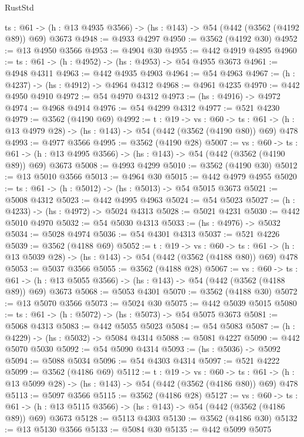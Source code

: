 \begin{lexlean}{RustStd}
\begin{coremodule}
  {ts : @61} -> (h : @13 @4935 @3566) -> (hs : @143) -> @54 (@442 (@3562 (@4192 @89)) @69) @3673
@4948 := @4933 @4297
@4950 := @3562 (@4192 @30)
@4952 := @13 @4950 @3566
@4953 := @4904 @30
@4955 := @442 @4919 @4895
@4960 := {ts : @61} -> (h : @4952) -> (hs : @4953) -> @54 @4955 @3673
@4961 := @4948 @4311
@4963 := @442 @4935 @4903
@4964 := @54 @4963
@4967 := (h : @4237) -> (hs : @4912) -> @4964 @4312
@4968 := @4961 @4235
@4970 := @442 @4950 @4910
@4972 := @54 @4970 @4312
@4973 := (hs : @4916) -> @4972
@4974 := @4968 @4914
@4976 := @54 @4299 @4312
@4977 := @521 @4230
@4979 := @3562 (@4190 @69)
@4992 := {t : @19} ->
  {vs : @60} ->
  {ts : @61} -> (h : @13 @4979 @28) -> (hs : @143) -> @54 (@442 (@3562 (@4190 @80)) @69) @478
@4993 := @4977 @3566
@4995 := @3562 (@4190 @28)
@5007 := {vs : @60} ->
  {ts : @61} -> (h : @13 @4995 @3566) -> (hs : @143) -> @54 (@442 (@3562 (@4190 @89)) @69) @3673
@5008 := @4993 @4299
@5010 := @3562 (@4190 @30)
@5012 := @13 @5010 @3566
@5013 := @4964 @30
@5015 := @442 @4979 @4955
@5020 := {ts : @61} -> (h : @5012) -> (hs : @5013) -> @54 @5015 @3673
@5021 := @5008 @4312
@5023 := @442 @4995 @4963
@5024 := @54 @5023
@5027 := (h : @4233) -> (hs : @4972) -> @5024 @4313
@5028 := @5021 @4231
@5030 := @442 @5010 @4970
@5032 := @54 @5030 @4313
@5033 := (hs : @4976) -> @5032
@5034 := @5028 @4974
@5036 := @54 @4301 @4313
@5037 := @521 @4226
@5039 := @3562 (@4188 @69)
@5052 := {t : @19} ->
  {vs : @60} ->
  {ts : @61} -> (h : @13 @5039 @28) -> (hs : @143) -> @54 (@442 (@3562 (@4188 @80)) @69) @478
@5053 := @5037 @3566
@5055 := @3562 (@4188 @28)
@5067 := {vs : @60} ->
  {ts : @61} -> (h : @13 @5055 @3566) -> (hs : @143) -> @54 (@442 (@3562 (@4188 @89)) @69) @3673
@5068 := @5053 @4301
@5070 := @3562 (@4188 @30)
@5072 := @13 @5070 @3566
@5073 := @5024 @30
@5075 := @442 @5039 @5015
@5080 := {ts : @61} -> (h : @5072) -> (hs : @5073) -> @54 @5075 @3673
@5081 := @5068 @4313
@5083 := @442 @5055 @5023
@5084 := @54 @5083
@5087 := (h : @4229) -> (hs : @5032) -> @5084 @4314
@5088 := @5081 @4227
@5090 := @442 @5070 @5030
@5092 := @54 @5090 @4314
@5093 := (hs : @5036) -> @5092
@5094 := @5088 @5034
@5096 := @54 @4303 @4314
@5097 := @521 @4222
@5099 := @3562 (@4186 @69)
@5112 := {t : @19} ->
  {vs : @60} ->
  {ts : @61} -> (h : @13 @5099 @28) -> (hs : @143) -> @54 (@442 (@3562 (@4186 @80)) @69) @478
@5113 := @5097 @3566
@5115 := @3562 (@4186 @28)
@5127 := {vs : @60} ->
  {ts : @61} -> (h : @13 @5115 @3566) -> (hs : @143) -> @54 (@442 (@3562 (@4186 @89)) @69) @3673
@5128 := @5113 @4303
@5130 := @3562 (@4186 @30)
@5132 := @13 @5130 @3566
@5133 := @5084 @30
@5135 := @442 @5099 @5075

\end{coremodule}
\end{lexlean}
